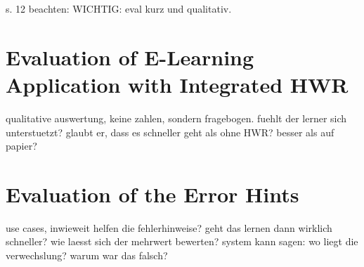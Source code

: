 s. 12 beachten: WICHTIG: eval kurz und qualitativ.

\section{Evaluation of E-Learning Application with Integrated HWR}
qualitative auswertung, keine zahlen, sondern fragebogen.
fuehlt der lerner sich unterstuetzt? glaubt er, dass es schneller geht als ohne 
HWR? 
besser als auf papier?

\section{Evaluation of the Error Hints}
use cases, inwieweit helfen die fehlerhinweise?
geht das lernen dann wirklich schneller?
wie laesst sich der mehrwert bewerten?
system kann sagen: wo liegt die verwechslung? warum war das falsch?


